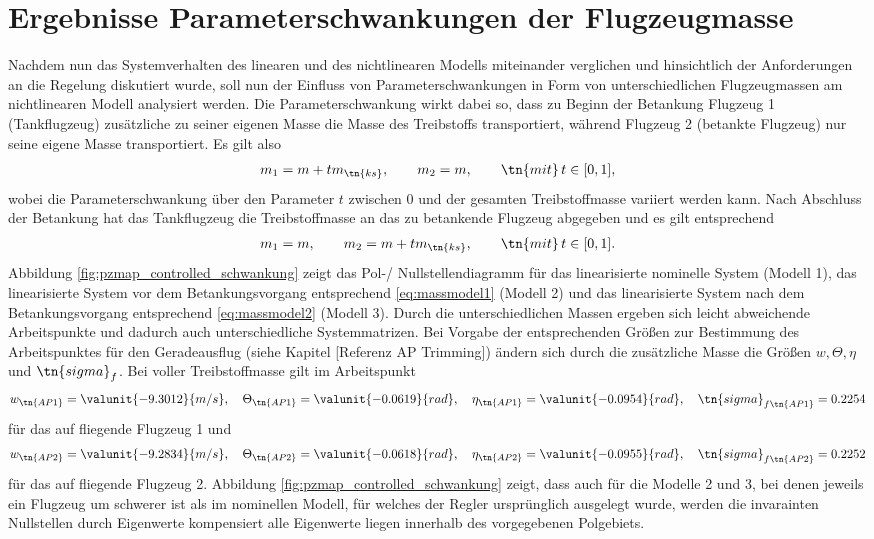 \section{Ergebnisse Parameterschwankungen der Flugzeugmasse}
Nachdem nun das Systemverhalten des linearen und des nichtlinearen Modells miteinander verglichen und hinsichtlich der Anforderungen an die Regelung diskutiert wurde, soll nun der Einfluss von Parameterschwankungen in Form von unterschiedlichen Flugzeugmassen am nichtlinearen Modell analysiert werden. Die Parameterschwankung wirkt dabei so, dass zu Beginn der Betankung Flugzeug 1 (Tankflugzeug) zusätzliche zu seiner eigenen Masse die Masse des Treibstoffs transportiert, während Flugzeug 2 (betankte Flugzeug) nur seine eigene Masse transportiert. Es gilt also 
\begin{align}
	m_1 = m + t m_\tn{ks}, \qquad m_2 = m, \qquad \tn{mit} \, t\in\lbrack0,1\rbrack,
\label{eq:massmodel1}
\end{align}
wobei die Parameterschwankung über den Parameter $t$ zwischen 0 und  der gesamten Treibstoffmasse variiert werden kann.
Nach Abschluss der Betankung hat das Tankflugzeug die Treibstoffmasse an das zu betankende Flugzeug abgegeben und es gilt entsprechend
\begin{align}
	m_1 = m , \qquad m_2 = m + t m_\tn{ks}, \qquad \tn{mit} \, t\in\lbrack0,1\rbrack.
\label{eq:massmodel2}
\end{align}
Abbildung \ref{fig:pzmap_controlled_schwankung} zeigt das Pol-/ Nullstellendiagramm für das linearisierte nominelle System (Modell 1), das linearisierte System vor dem Betankungsvorgang entsprechend \ref{eq:massmodel1} (Modell 2) und das linearisierte System nach dem Betankungsvorgang entsprechend \ref{eq:massmodel2} (Modell 3). Durch die unterschiedlichen Massen ergeben sich leicht abweichende Arbeitspunkte und dadurch auch unterschiedliche Systemmatrizen. Bei Vorgabe der entsprechenden Größen zur Bestimmung des Arbeitspunktes für den Geradeausflug (siehe Kapitel [Referenz AP Trimming]) ändern sich durch die zusätzliche Masse die Größen $w, \Theta, \eta$ und $\tn{sigma}_f$. Bei voller Treibstoffmasse gilt im Arbeitspunkt
\begin{align*}
w_\tn{AP1} = \valunit{-9.3012}{m/s}, \quad \Theta_\tn{AP1} = \valunit{-0.0619}{rad}, \quad \eta_\tn{AP1} = \valunit{-0.0954}{rad}, \quad \tn{sigma}_{f\tn{AP1}} = 0.2254
\end{align*}
für das auf  fliegende Flugzeug 1 und 
\begin{align*}
w_\tn{AP2} = \valunit{-9.2834}{m/s}, \quad \Theta_\tn{AP2} = \valunit{-0.0618}{rad}, \quad \eta_\tn{AP2} = \valunit{-0.0955}{rad}, \quad \tn{sigma}_{f\tn{AP2}} = 0.2252
\end{align*}
für das auf  fliegende Flugzeug 2.
Abbildung \ref{fig:pzmap_controlled_schwankung} zeigt, dass auch für die Modelle 2 und 3, bei denen jeweils ein Flugzeug um  schwerer ist als im nominellen Modell, für welches der Regler ursprünglich ausgelegt wurde, werden die invarainten Nullstellen durch Eigenwerte kompensiert alle Eigenwerte liegen innerhalb des vorgegebenen Polgebiets.

